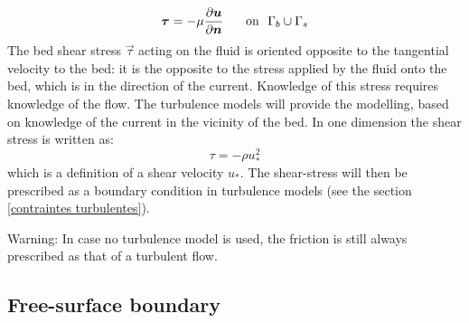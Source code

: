 \begin{align}
  \vec{\tau} = -\mu\dfrac{\partial \vec{u}}{\partial\vec{n}}\hspace{0.5cm}\text{ on ~}\Gamma_b \cup \Gamma_s
\end{align}
The bed shear stress $\vec{\tau}$
acting on the fluid is oriented opposite to the tangential velocity to the bed:
it is the opposite to the stress applied by the fluid onto the bed, which
is in the direction of the current.
Knowledge of this stress requires knowledge of the flow.
The turbulence models will provide the modelling, based on knowledge of the current in the vicinity of the bed.
In one dimension the shear stress is written as:
\begin{equation}
  \tau=-\rho u_*^{2}%
\end{equation}
which is a definition of a shear velocity $u_{\ast}$.
The shear-stress will then be prescribed as a boundary condition in turbulence models
(see the section \ref{contraintes turbulentes}).

\begin{WarningBlock}{Warning:}
In case no turbulence model is used, the friction is still always prescribed as that of a turbulent flow.
\end{WarningBlock}
\subsection{Free-surface boundary}

